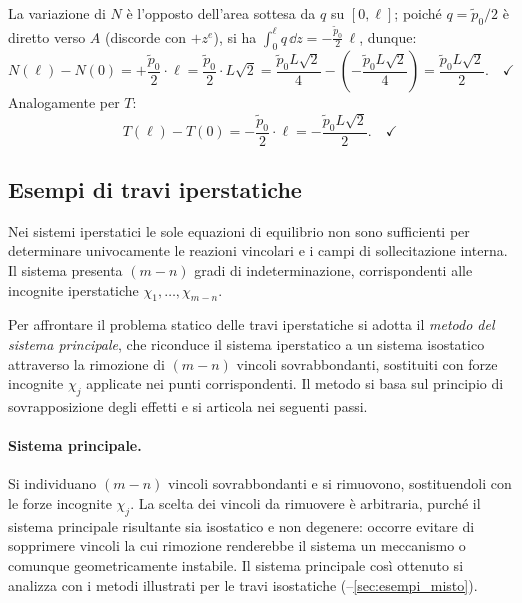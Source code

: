 \begin{esempio}
\begin{svolgimento}


		
		
		La variazione di $N$ è l'opposto dell'area
		sottesa da $q$ su $[0,\ell]$; poiché
		$q = \tilde{p}_0/2$ è diretto verso $A$
		(discorde con $+z^e$), si ha
		$\int_0^\ell q\,\dd z = -\frac{\tilde{p}_0}{2}\,\ell$,
		dunque:
		\[
		N(\ell) - N(0) = +\frac{\tilde{p}_0}{2}\cdot\ell
		= \frac{\tilde{p}_0}{2}\cdot L\sqrt{2}
		= \frac{\tilde{p}_0L\sqrt{2}}{4}
		-\left(-\frac{\tilde{p}_0L\sqrt{2}}{4}\right)
		= \frac{\tilde{p}_0L\sqrt{2}}{2}.
		\quad\checkmark
		\]
		Analogamente per $T$:
		\[
		T(\ell) - T(0) = -\frac{\tilde{p}_0}{2}\cdot\ell
		= -\frac{\tilde{p}_0L\sqrt{2}}{2}.
		\quad\checkmark
		\]
	\end{svolgimento}
\end{esempio}



\subsection{Esempi di travi iperstatiche}
\label{sec:esempi_iperstatiche}

Nei sistemi iperstatici le sole equazioni di
equilibrio non sono sufficienti per determinare
univocamente le reazioni vincolari e i campi di
sollecitazione interna. Il sistema presenta $(m-n)$ gradi di
indeterminazione, corrispondenti alle incognite
iperstatiche $\chi_1, \ldots, \chi_{m-n}$.

Per affrontare il problema statico delle travi
iperstatiche si adotta il \emph{metodo del sistema
	principale}, che riconduce il sistema iperstatico
a un sistema isostatico attraverso la rimozione
di $(m-n)$ vincoli sovrabbondanti, sostituiti con
forze incognite $\chi_j$ applicate nei punti
corrispondenti. Il metodo si basa sul principio
di sovrapposizione degli effetti e si articola
nei seguenti passi.

\paragraph{Sistema principale.}
Si individuano $(m-n)$ vincoli sovrabbondanti e
si rimuovono, sostituendoli con le forze incognite
$\chi_j$. La scelta dei vincoli da rimuovere è
arbitraria, purché il sistema principale risultante
sia isostatico e non degenere: occorre evitare
di sopprimere vincoli la cui rimozione renderebbe
il sistema un meccanismo o comunque geometricamente
instabile. Il sistema principale così ottenuto
si analizza con i metodi illustrati per le travi
isostatiche (--\ref{sec:esempi_misto}).


